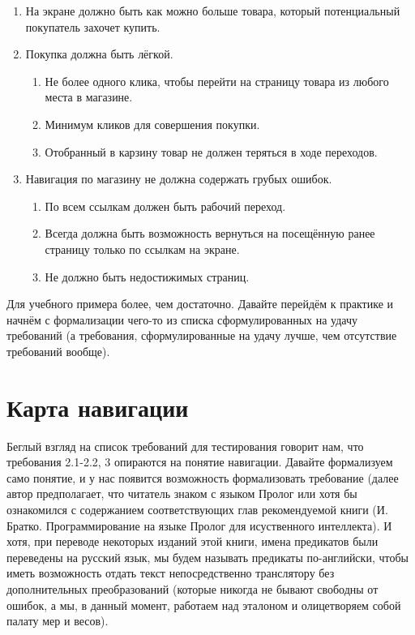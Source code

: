 \documentclass[a4paper]{book}
\begin{document}
\begin{enumerate}
\item На экране должно быть как можно больше товара, который
потенциальный покупатель захочет купить.
\item Покупка должна быть лёгкой.
\begin{enumerate}
\item Не более одного клика, чтобы перейти на страницу товара из
любого места в магазине.
\item Минимум кликов для совершения покупки.
\item Отобранный в карзину товар не должен теряться в ходе
переходов.
\end{enumerate}
\item Навигация по магазину не должна содержать грубых ошибок.
\begin{enumerate}
\item По всем ссылкам должен быть рабочий переход.
\item Всегда должна быть возможность вернуться на посещённую ранее
страницу только по ссылкам на экране.
\item Не должно быть недостижимых страниц.
\end{enumerate}
\end{enumerate}

Для учебного примера более, чем достаточно. Давайте перейдём к
практике и начнём с формализации чего-то из списка
сформулированных на удачу требований (а требования,
сформулированные на удачу лучше, чем отсутствие требований
вообще).

\section{Карта навигации}

Беглый взгляд на список требований для тестирования говорит нам,
что требования 2.1-2.2, 3 опираются на понятие навигации. Давайте
формализуем само понятие, и у нас появится возможность
формализовать требование (далее автор предполагает, что читатель
знаком с языком Пролог или хотя бы ознакомился с содержанием
соответствующих глав рекомендуемой книги
(И. Братко. Программирование на языке Пролог для исуственного
интеллекта). И хотя, при переводе некоторых изданий этой книги,
имена предикатов были переведены на русский язык, мы будем
называть предикаты по-английски, чтобы иметь возможность отдать
текст непосредственно транслятору без дополнительных
преобразований (которые никогда не бывают свободны от ошибок, а
мы, в данный момент, работаем над эталоном и олицетворяем собой
палату мер и весов).
\end{document}
